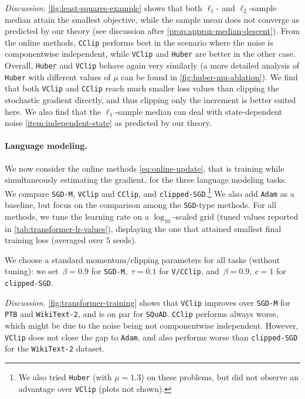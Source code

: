 \documentclass[10pt]{article} %
\newcommand{\SGD}{\texttt{SGD}}
\newcommand{\SGDM}{\texttt{SGD-M}}
\newcommand{\VC}{\texttt{VClip}}
\newcommand{\CC}{\texttt{CClip}}
\newcommand{\HC}{\texttt{Huber}}
\begin{document}
\emph{Discussion.} \cref{fig:least-squares-example} shows that both $\ell_1$- and $\ell_2$-sample median attain the smallest objective, while the sample mean does not converge as predicted by our theory (see discussion after \cref{prop:approx-median-descent}). From the online methods, \CC{} performs best in the scenario where the noise is componentwise independent, while \VC{} and \HC{} are better in the other case. Overall, \HC{} and \VC{} behave again very similarly (a more detailed analysis of \HC{} with different values of $\mu$ can be found in \cref{fig:huber-mu-ablation}). We find that both \VC{} and \CC{} reach much smaller loss values than clipping the stochastic gradient directly, and thus clipping only the increment is better suited here. We also find that the $\ell_1$-sample median can deal with state-dependent noise \ref{item:independent-state}  as predicted by our theory. 
%

\paragraph{Language modeling.} We now consider the online methods \eqref{eq:online-update}, that is training while simultaneously estimating the gradient, for the three language modeling tasks.
We compare \SGDM{}, \VC{} and \CC{}, and \texttt{clipped-SGD}.\footnote{We also tried \HC{} (with $\mu=1.3$) on these problems, but did not observe an advantage over \VC{} (plots not shown).} We also add \texttt{Adam} as a baseline, but focus on the comparison among the \SGD{}-type methods. For all methods, we tune the learning rate on a $\log_{10}$-scaled grid (tuned values reported in \cref{tab:transformer-lr-values}), displaying the one that attained smallest final training loss (averaged over $5$ seeds). 

We choose a standard momentum/clipping parameters for all tasks (without tuning): we set~$\beta=0.9$ for \SGDM{},~$\tau=0.1$ for \texttt{V/CClip}, and~$\beta=0.9,~c=1$ for \texttt{clipped-SGD}.

\emph{Discussion.} \cref{fig:transformer-training} shows that \VC{} improves over \SGDM{} for \texttt{PTB} and \texttt{WikiText-2}, and is on par for \texttt{SQuAD}. \CC{} performs always worse, which might be due to the noise being not componentwise independent.
However, \VC{} does not close the gap to \texttt{Adam}, and also performs worse than \texttt{clipped-SGD} for the \texttt{WikiText-2} dataset.
\end{document}
